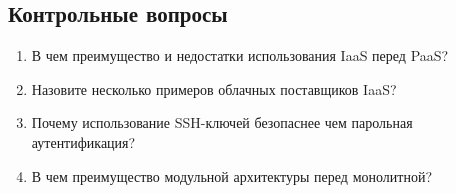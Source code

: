 \subsection{Контрольные вопросы}
\begin{enumerate}
    \item В чем преимущество и недостатки использования IaaS перед PaaS?
    \item Назовите несколько примеров облачных поставщиков IaaS?
    \item Почему использование SSH-ключей безопаснее чем парольная аутентификация?
    \item В чем преимущество модульной архитектуры перед монолитной?
\end{enumerate}

\clearpage
